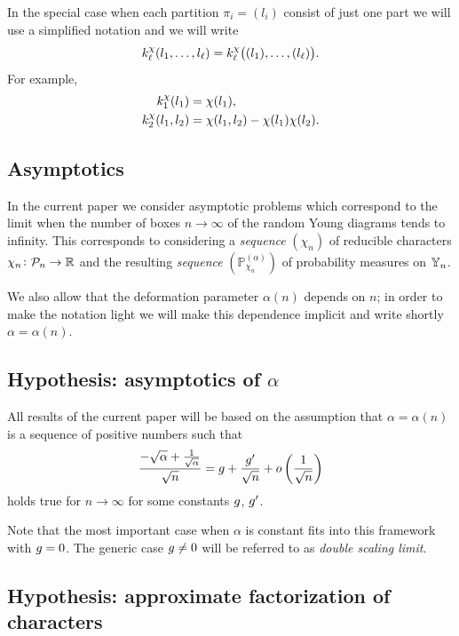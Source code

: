 \documentclass[12pt,usenames,dvipsnames,svgnames,table]{amsart}
\begin{document}
In the special case when each partition 
$\pi_i=(l_i)$ consist of just one part we will use a simplified notation and we will write
\[ k^{\chi}_\ell(l_1,\dots,l_\ell) = k^{\chi}_\ell\big( (l_1),\dots,(l_\ell) \big).
\]
For example,
\begin{align*}
k^{\chi}_1(l_1) &= \chi(l_1), \\   
k^{\chi}_2(l_1,l_2) &= \chi(l_1,l_2)- \chi(l_1) \chi(l_2).
\end{align*}

\subsection{Asymptotics}

In the current paper we consider asymptotic problems which correspond to the limit 
when the number of boxes  $n\to\infty $ of the random Young diagrams tends to infinity.
This corresponds to considering a \emph{sequence} $(\chi_n)$ of reducible characters
$\chi_n\colon \mathcal{P}_{n}\to\mathbb{R}$ and the resulting \emph{sequence}
$(\mathbb{P}^{(\alpha)}_{\chi_n})$ of probability measures on $\mathbb{Y}_{n}$.

We also allow that the deformation parameter $\alpha(n)$ depends on $n$;
in order to make the notation light we will 
make this dependence implicit and write shortly $\alpha=\alpha(n)$.

\subsection{Hypothesis: asymptotics of $\alpha$}
\label{sec:hypothesis-double-scaling}
All results of the current paper will be based on the assumption 
that $\alpha=\alpha(n)$ is a sequence of positive numbers such that
\begin{equation} 
\label{eq:double-scaling-refined}
\frac{-\sqrt{\alpha}+\frac{1}{\sqrt{\alpha}}}{\sqrt{n}} = 
g + \frac{g'}{\sqrt{n}} + o\left( \frac{1}{\sqrt{n}} \right)
\end{equation}
holds true for $n\to\infty$ for some constants $g$, $g'$.

Note that the most important case when $\alpha$ is constant fits into this framework with $g=0$.
The generic case $g\neq 0$ will be referred to as 
\emph{double scaling limit}.

\subsection{Hypothesis: approximate factorization of characters}
\label{sec:partitions}
\end{document}
